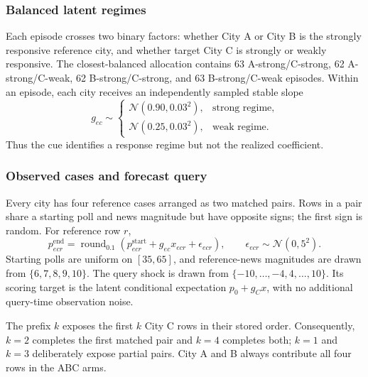 \subsubsection{Balanced latent regimes}
Each episode crosses two binary factors: whether City A or City B is the strongly
responsive reference city, and whether target City C is strongly or weakly
responsive. The closest-balanced allocation contains 63 A-strong/C-strong,
62 A-strong/C-weak, 62 B-strong/C-strong, and 63 B-strong/C-weak episodes.
Within an episode, each city receives an independently sampled stable slope
\[
  g_{ec}\sim
  \begin{cases}
    \mathcal N(0.90,0.03^2), & \text{strong regime},\\
    \mathcal N(0.25,0.03^2), & \text{weak regime}.
  \end{cases}
\]
Thus the cue identifies a response regime but not the realized coefficient.

\subsubsection{Observed cases and forecast query}
Every city has four reference cases arranged as two matched pairs. Rows in a pair
share a starting poll and news magnitude but have opposite signs; the first sign is
random. For reference row \(r\),
\[
  p^{\mathrm{end}}_{ecr}
    = \operatorname{round}_{0.1}
      \left(p^{\mathrm{start}}_{ecr}+g_{ec}x_{ecr}
      +\epsilon_{ecr}\right),
  \qquad \epsilon_{ecr}\sim\mathcal N(0,5^2).
\]
Starting polls are uniform on \([35,65]\), and reference-news magnitudes are drawn
from \(\{6,7,8,9,10\}\). The query shock is drawn from
\(\{-10,\ldots,-4,4,\ldots,10\}\). Its scoring target is the latent conditional
expectation \(p_0+g_Cx\), with no additional query-time observation noise.

The prefix \(k\) exposes the first \(k\) City C rows in their stored order.
Consequently, \(k=2\) completes the first matched pair and \(k=4\) completes both;
\(k=1\) and \(k=3\) deliberately expose partial pairs. City A and B always
contribute all four rows in the ABC arms.

